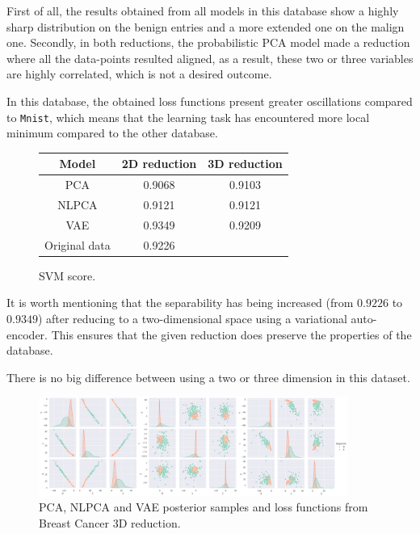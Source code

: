 First of all, the results obtained from all models in this database show a highly sharp distribution on the benign entries and a more extended one on the malign one. Secondly, in both reductions, the probabilistic PCA model made a reduction where all the data-points resulted aligned, as a result, these two or three variables are highly correlated, which is not a desired outcome.

In this database, the obtained loss functions present greater oscillations compared to \texttt{Mnist}, which means that the learning task has encountered more local minimum compared to the other database.

\begin{figure}
  \centering
  \begin{tabular}{ccc}
    \hline
    Model    & 2D reduction & 3D reduction \\\hline
    PCA      & 0.9068 & 0.9103\\
    NLPCA    & 0.9121 & 0.9121\\
    VAE      & 0.9349 & 0.9209\\
    \hline
    \hline
    Original data & 0.9226 \\
    \hline
  \end{tabular}
  \caption{SVM score.}\label{tab:breast}
\end{figure}

It is worth mentioning that the separability has being increased (from \(0.9226\) to \(0.9349\)) after reducing to a two-dimensional space using a variational auto-encoder. This ensures that the given reduction does preserve the properties of the database.

There is no big difference between using a two or three dimension in this dataset.

\begin{figure}[ht]
  \centering
  \includegraphics[width = 0.9\textwidth]{tex/images/breast_3D.png}
  \caption{PCA, NLPCA and VAE posterior samples and loss functions from Breast Cancer 3D reduction.}\label{fig:breast_posterior_3D}
\end{figure}

